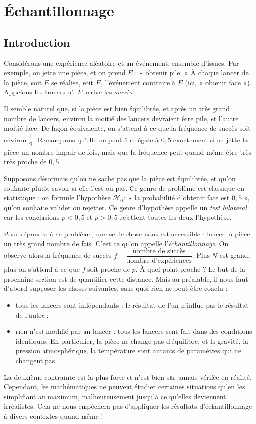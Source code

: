 
\chapter{Échantillonnage}

\section{Introduction}

Considérons une expérience aléatoire et un événement, ensemble d'issues.
Par exemple, on jette une pièce, et on prend $E$ : « obtenir pile. »
À chaque lancer de la pièce, soit $E$ se réalise, soit $\overline{E}$, l'événement contraire à $E$ (ici, « obtenir face »).
Appelons les lancers où $E$ arrive les \emph{succès}.

Il semble naturel que, si la pièce est bien équilibrée, et après un très grand nombre de lancers, environ la moitié des lancers devraient être pile, et l'autre moitié face.
De façon équivalente, on s'attend à ce que la fréquence de succès soit environ $\dfrac12$.
Remarquons qu'elle ne peut être égale à $0,5$ exactement si on jette la pièce un nombre impair de fois, mais que la fréquence peut quand même être très très proche de $0,5$.

Supposons désormais qu'on ne sache pas que la pièce est équilibrée, et qu'on souhaite plutôt savoir si elle l'est ou pas.
Ce genre de problème est classique en statistique : on formule l'hypothèse $\mathcal{H}_0 :$ « la probabilité d'obtenir face est $0,5$ », qu'on souhaite valider ou rejetter.
Ce genre d'hypothèse appelle un \emph{test bilatéral} car les conclusions $p< 0,5$ et $p>0,5$ rejettent toutes les deux l'hypothèse.

Pour répondre à ce problème, une seule chose nous est accessible : lancer la pièce un très grand nombre de fois.
C'est ce qu'on appelle l'\emph{échantillonnage}.
On observe alors la fréquence de succès $f = \dfrac{\text{nombre de succès}}{\text{nombre d'expériences}}$.
Plus $N$ est grand, plus on s'attend à ce que $f$ soit proche de $p$. À quel point proche ? Le but de la prochaine section est de quantifier cette distance.
Mais au préalable, il nous faut d'abord supposer les choses suivantes, sans quoi rien ne peut être conclu :
	\begin{itemize}
		\item tous les lancers sont indépendants : le résultat de l'un n'influe pas le résultat de l'autre ;
		\item rien n'est modifié par un lancer : tous les lancers sont fait dans des conditions identiques. En particulier, la pièce ne change pas d'équilibre, et la gravité, la pression atmosphérique, la température sont autants de paramètres qui ne changent pas.
	\end{itemize}
La deuxième contrainte est la plus forte et n'est bien sûr jamais vérifée en réalité.
Cependant, les mathématiques ne peuvent étudier certaines situations qu'en les simplifiant au maximum, malheureusement jusqu'à ce qu'elles deviennent irréalistes.
Cela ne nous empêchera pas d'appliquer les résultats d'échantillonnage à divers contextes quand même !


